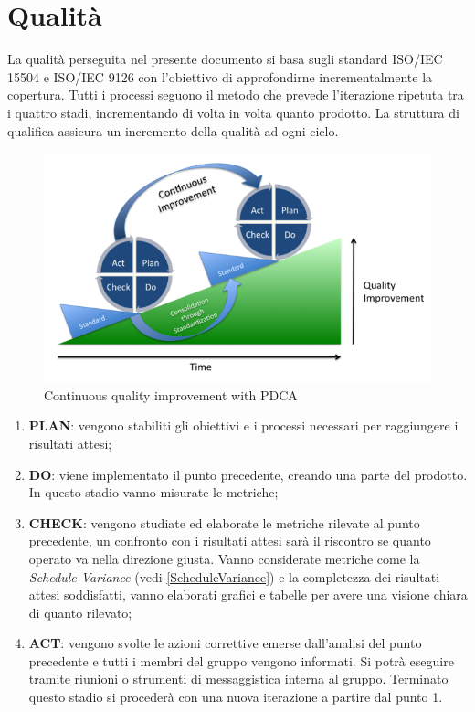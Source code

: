 \pagebreak
\section{Qualità}
\label{appendice-qualita}
La qualità perseguita nel presente documento si basa sugli standard ISO/IEC 15504  e ISO/IEC 9126 con l'obiettivo di approfondirne incrementalmente la copertura. Tutti i processi seguono il metodo  che prevede l'iterazione ripetuta tra i quattro stadi, incrementando di volta in volta quanto prodotto. La struttura di qualifica assicura un incremento della qualità ad ogni ciclo. \\
	\begin{figure}[h]
	\centering \includegraphics[width=1\textwidth]{PDCA.png}
	\caption{Continuous quality improvement with PDCA}
	\end{figure}
	
	\begin{enumerate}
		\item \textbf{PLAN}: vengono stabiliti gli obiettivi e i processi necessari per raggiungere i risultati attesi;
		\item \textbf{DO}: viene implementato il punto precedente, creando una parte del prodotto. In questo stadio vanno misurate le metriche;
		\item \textbf{CHECK}: vengono studiate ed elaborate le metriche rilevate al punto precedente, un confronto con i risultati attesi sarà il riscontro se quanto operato va nella direzione giusta. Vanno considerate metriche come la \emph{Schedule Variance} (vedi \ref{ScheduleVariance}) e la completezza dei risultati attesi soddisfatti, vanno elaborati grafici e tabelle per avere una visione chiara di quanto rilevato;
		\item \textbf{ACT}: vengono svolte le azioni correttive emerse dall'analisi del punto precedente e tutti i membri del gruppo vengono informati. Si potrà eseguire tramite riunioni o strumenti di messaggistica interna al gruppo. Terminato questo stadio si procederà con una nuova iterazione a partire dal punto 1.
	\end{enumerate}

